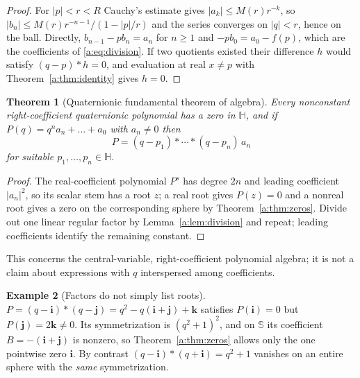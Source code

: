 \documentclass[11pt,a4paper]{article}
\numberwithin{equation}{section}
\newtheorem{theorem}{Theorem}[section]
\theoremstyle{definition}
\newtheorem{example}[theorem]{Example}
\theoremstyle{remark}
\theoremstyle{plain}
\newcommand{\HH}{\mathbb H}
\newcommand{\SSS}{\mathbb S}
\newcommand{\abs}[1]{\lvert #1\rvert}
\begin{document}
\begin{proof}
For $\abs p<r<R$ Cauchy's estimate gives $\abs{a_k}\le M(r)r^{-k}$, so
$\abs{b_n}\le M(r)r^{-n-1}/(1-\abs p/r)$ and the series converges on
$\abs q<r$, hence on the ball. Directly, $b_{n-1}-pb_n=a_n$ for $n\ge1$ and
$-pb_0=a_0-f(p)$, which are the coefficients of \eqref{a:eq:division}. If two
quotients existed their difference $h$ would satisfy $(q-p)*h=0$, and
evaluation at real $x\ne p$ with Theorem~\ref{a:thm:identity} gives $h=0$.
\end{proof}

\begin{theorem}[Quaternionic fundamental theorem of algebra]
\label{a:thm:FTA}
Every nonconstant right-coefficient quaternionic polynomial has a zero in
$\HH$, and if $P(q)=q^na_n+\dots+a_0$ with $a_n\ne0$ then
\begin{equation}
 P=(q-p_1)*\cdots*(q-p_n)\,a_n
 \label{a:eq:factorization}
\end{equation}
for suitable $p_1,\dots,p_n\in\HH$.
\end{theorem}

\begin{proof}
The real-coefficient polynomial $P^s$ has degree $2n$ and leading coefficient
$\abs{a_n}^2$, so its scalar stem has a root $z$; a real root gives $P(z)=0$
and a nonreal root gives a zero on the corresponding sphere by
Theorem~\ref{a:thm:zeros}. Divide out one linear regular factor by
Lemma~\ref{a:lem:division} and repeat; leading coefficients identify the
remaining constant.
\end{proof}

This concerns the central-variable, right-coefficient polynomial algebra; it
is not a claim about expressions with $q$ interspersed among coefficients.

\begin{example}[Factors do not simply list roots]
\label{a:ex:factors}
$P=(q-\mathbf i)*(q-\mathbf j)=q^2-q(\mathbf i+\mathbf j)+\mathbf k$ satisfies
$P(\mathbf i)=0$ but $P(\mathbf j)=2\mathbf k\ne0$. Its symmetrization is
$(q^2+1)^2$, and on $\SSS$ its coefficient $B=-(\mathbf i+\mathbf j)$ is
nonzero, so Theorem~\ref{a:thm:zeros} allows only the one pointwise zero
$\mathbf i$. By contrast $(q-\mathbf i)*(q+\mathbf i)=q^2+1$ vanishes on an
entire sphere with the \emph{same} symmetrization.
\end{example}
\end{document}
